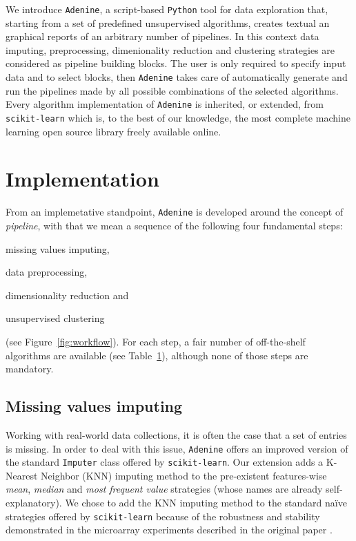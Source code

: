 \documentclass[twoside,11pt]{article}
\makeatletter
\newcommand{\ade}{\texttt{Adenine}\@\xspace}
\newcommand{\py}{\texttt{Python}\@\xspace}
\makeatother
\begin{document}
We introduce \ade, a script-based \py tool for data exploration that, starting from a set of predefined unsupervised algorithms, creates textual an graphical reports of an arbitrary number of pipelines. In this context data imputing, preprocessing, dimenionality reduction and clustering strategies are considered as pipeline building blocks. The user is only required to specify input data and to select blocks, then \ade takes care of automatically generate and run the pipelines made by all possible combinations of the selected algorithms. Every algorithm implementation of \ade is inherited, or extended, from \texttt{scikit-learn} \citep{scikit-learn} which is, to the best of our knowledge, the most complete machine learning open source library freely available online.


\section{Implementation}\label{sec:implem}
From an implemetative standpoint, \ade is developed around the concept of \emph{pipeline}, with that we mean a sequence of the following four fundamental steps:
\begin{enumerate*}[label=(\roman*)]
  \item missing values imputing,
  \item data preprocessing,
  \item dimensionality reduction and
  \item unsupervised clustering
\end{enumerate*} (see Figure~\ref{fig:workflow}).
For each step, a fair number of off-the-shelf algorithms are available (see Table~\ref{sec:implem}), although none of those steps are mandatory.

\subsection*{Missing values imputing}
Working with real-world data collections, it is often the case that a set of entries is missing. In order to deal with this issue, \ade offers an improved version of the standard \texttt{Imputer} class offered by \texttt{scikit-learn}. Our extension adds a K-Nearest Neighbor (KNN) imputing method \citep{troyanskaya2001missing} to the pre-existent features-wise \emph{mean}, \emph{median} and \emph{most frequent value} strategies (whose names are already self-explanatory). We chose to add the KNN imputing method to the standard na\"ive strategies offered by \texttt{scikit-learn} because of the robustness and stability demonstrated in the microarray experiments described in the original paper \citep{troyanskaya2001missing}.
\end{document}

